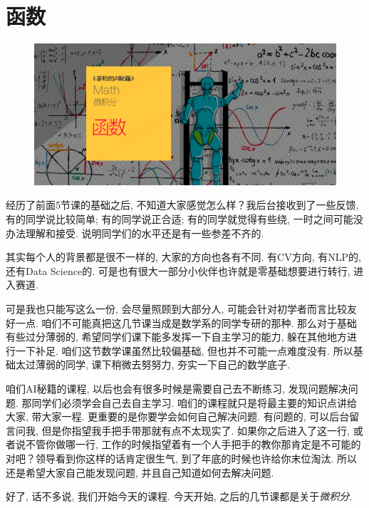 \chapter{函数}

\begin{figure}[ht]
  \centering
  \includegraphics[width=1\textwidth]{asset/db906cac-445d-46ef-b733-ef927c4d71fa.png}
\end{figure}

\newpage

经历了前面5节课的基础之后, 不知道大家感觉怎么样？我后台接收到了一些反馈, 有的同学说比较简单; 有的同学说正合适; 有的同学就觉得有些绕, 一时之间可能没办法理解和接受. 说明同学们的水平还是有一些参差不齐的. 

其实每个人的背景都是很不一样的, 大家的方向也各有不同. 有CV方向, 有NLP的, 还有Data Science的. 可是也有很大一部分小伙伴也许就是零基础想要进行转行, 进入赛道. 

可是我也只能写这么一份, 会尽量照顾到大部分人, 可能会针对初学者而言比较友好一点. 咱们不可能真把这几节课当成是数学系的同学专研的那种. 那么对于基础有些过分薄弱的, 希望同学们课下能多发挥一下自主学习的能力, 躲在其他地方进行一下补足. 咱们这节数学课虽然比较偏基础, 但也并不可能一点难度没有. 所以基础太过薄弱的同学, 课下稍微去努努力, 夯实一下自己的数学底子. 

咱们AI秘籍的课程, 以后也会有很多时候是需要自己去不断练习, 发现问题解决问题. 那同学们必须学会自己去自主学习. 咱们的课程就只是将最主要的知识点讲给大家, 带大家一程. 更重要的是你要学会如何自己解决问题. 有问题的, 可以后台留言问我, 但是你指望我手把手带那就有点不太现实了. 如果你之后进入了这一行, 或者说不管你做哪一行, 工作的时候指望着有一个人手把手的教你那肯定是不可能的对吧？领导看到你这样的话肯定很生气, 到了年底的时候也许给你末位淘汰. 所以还是希望大家自己能发现问题, 并且自己知道如何去解决问题. 

好了, 话不多说, 我们开始今天的课程. 今天开始, 之后的几节课都是关于\textit{微积分}. 

